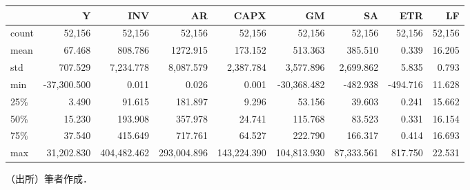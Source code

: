 \begin{threeparttable}  

\begin{tabular}{lrrrrrrrr}
\toprule
{} &        Y &         INV &          AR &        CAPX &          GM &         SA &        ETR &         LF \\
\midrule
count &  52,156 &   52,156 &   52,156 &   52,156 &   52,156 &  52,156 &  52,156 &  52,156 \\
mean  &     67.468 &     808.786 &    1272.915 &     173.152 &     513.363 &    385.510 &      0.339 &     16.205 \\
std   &    707.529 &    7,234.778 &    8,087.579 &    2,387.784 &    3,577.896 &   2,699.862 &      5.835 &      0.793 \\
min   & -37,300.500 &       0.011 &       0.026 &       0.001 &  -30,368.482 &   -482.938 &   -494.716 &     11.628 \\
25\%   &      3.490 &      91.615 &     181.897 &       9.296 &      53.156 &     39.603 &      0.241 &     15.662 \\
50\%   &     15.230 &     193.908 &     357.978 &      24.741 &     115.768 &     83.523 &      0.331 &     16.154 \\
75\%   &     37.540 &     415.649 &     717.761 &      64.527 &     222.790 &    166.317 &      0.414 &     16.693 \\
max   &  31,202.830 &  404,482.462 &  293,004.896 &  143,224.390 &  104,813.930 &  87,333.561 &    817.750 &     22.531 \\
\bottomrule
\end{tabular}

\begin{tablenotes}
    \item[]（出所）筆者作成．
\end{tablenotes}
\end{threeparttable}  